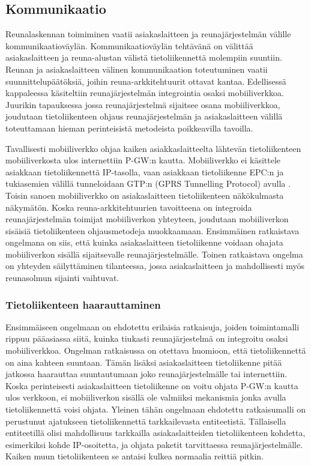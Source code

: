 \subsection{Kommunikaatio} \label{kommunikaatio}
Reunalaskennan toimiminen vaatii asiakaslaitteen ja reunajärjestelmän välille kommunikaatioväylän.
Kommunikaatioväylän tehtävänä on välittää asiakaslaitteen ja reuna-alustan välistä tietoliikennettä molempiin suuntiin.
Reunan ja asiakaslaitteen välinen kommunikaation toteutuminen vaatii suunnittelupäätöksiä, joihin reuna-arkkitehtuurit ottavat kantaa. 
Edellisessä kappaleessa käsiteltiin reunajärjestelmän integrointia osaksi mobiiliverkkoa. Juurikin tapauksessa jossa reunajärjestelmä sijaitsee osana mobiiliverkkoa, joudutaan tietoliikenteen ohjaus reunajärjestelmän ja asiakaslaitteen välillä toteuttamaan hieman perinteisistä metodeista poikkeavilla tavoilla.

Tavallisesti mobiiliverkko ohjaa kaiken asiakkaslaitteelta lähtevän tietoliikenteen mobiiliverkosta ulos internettiin P-GW:n kautta. 
Mobiiliverkko ei käsittele asiakkaan tietoliikennettä IP-tasolla, vaan asiakkaan tietoliikenne EPC:n ja tukiasemien välillä tunneloidaan GTP:n (GPRS Tunnelling Protocol) avulla \cite{puente15seamless}.
Toisin sanoen mobiiliverkko on asiakaslaitteen tietoliikenteen näkökulmasta näkymätön.
Koska reuna-arkkitehtuurien tavoitteena on integroida reunajärjestelmän toimijat mobiiliverkon yhteyteen, joudutaan mobiiliverkon sisäisiä tietoliikenteen ohjausmetodeja muokkaamaan.
Ensimmäinen ratkaistava ongelmana on siis, että kuinka asiakaslaitteen tietoliikenne voidaan ohajata mobiiliverkon sisällä sijaitsevalle reunajärjestelmälle.
Toinen ratkaistava ongelma on yhteyden säilyttäminen tilanteessa, jossa asiakaslaitteen ja mahdollisesti myös reunasolmun sijainti vaihtuvat.

\subsubsection*{Tietoliikenteen haarauttaminen}
Ensimmäiseen ongelmaan on ehdotettu erilaisia ratkaisuja, joiden toimintamalli rippuu pääasiassa siitä, kuinka tiukasti reunajärjestelmä on integroitu osaksi mobiiliverkkoa.
Ongelman ratkaisussa on otettava huomioon, että tietoliikennettä on aina kahteen suuntaan. Tämän lisäksi asiakaslaitteen tietoliikenne pitää jatkossa haarauttaa suuntautumaan joko reunajärjestelmälle tai internettiin. 
Koska perinteisesti asiakaslaitteen tietoliikenne on voitu ohjata P-GW:n kautta ulos verkkoon, ei mobiiliverkon sisällä ole valmiiksi mekanismia jonka avulla tietoliikennettä voisi ohjata.
Yleinen tähän ongelmaan ehdotettu ratkaisumalli on perustunut ajatukseen tietoliikennettä tarkkailevasta entiteetistä.
Tällaisella entiteetillä olisi mahdollisuus tarkkailla asiakaslaitteiden tietoliikenteen kohdetta, esimerkiksi kohde IP-osoitetta, ja ohjata paketit tarvittaessa reunajärjestelmälle.
Kaiken muun tietoliikenteen se antaisi kulkea normaalia reittiä pitkin.

